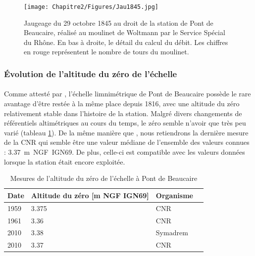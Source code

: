     \begin{figure}[h]
	\centering
		\texttt{[image: Chapitre2/Figures/Jau1845.jpg]}
        \caption{Jaugeage du 29 octobre 1845 au droit de la station de Pont de Beaucaire, réalisé au moulinet de Woltmann par le Service Spécial du Rhône. En bas à droite, le détail du calcul du débit. Les chiffres en rouge représentent le nombre de tours du moulinet.}	
		\label{fig:Jau1845}
	\end{figure}
    	
\FloatBarrier

	\subsubsection{Évolution de l'altitude du zéro de l'échelle}
    
    \paragraph{} Comme attesté par \citet{pichard_hauteurs_2013}, l'échelle limnimétrique de Pont de Beaucaire possède le rare avantage d'être restée à la même place depuis 1816, avec une altitude du zéro relativement stable dans l'histoire de la station. Malgré divers changements de référentiels altimétriques au cours du temps, le zéro semble n'avoir que très peu varié (tableau \ref{tab:zeroPt}). De la même manière que \citet{bard_actualisation_2018}, nous retiendrons la dernière mesure de la CNR qui semble être une valeur médiane de l'ensemble des valeurs connues : 3.37~m~NGF~IGN69. De plus, celle-ci est compatible avec les valeurs données lorsque la station était encore exploitée.

            \begin{table}[h]
                \centering
                \caption{Mesures de l'altitude du zéro de l'échelle à Pont de Beaucaire}
            	\label{tab:zeroPt}
                \begin{tabular}{| m{1.5cm} | m{3cm}| m{3cm} | m{2cm} |} 
                    \hline
                    Date & Altitude du zéro [m NGF IGN69] & Organisme \\
                    \hline
                    1959 &	3.375 &	CNR\\
                    \hline
                    1961 &	3.36 &	CNR\\
                    \hline
                    2010 &	3.38 &	Symadrem\\
                    \hline
                    2010 &	3.37 &	CNR\\
                    \hline
            \end{tabular}
        \end{table}


